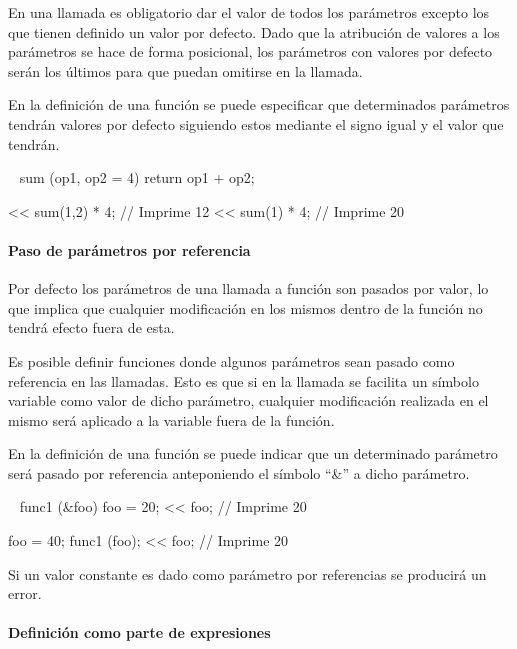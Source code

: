 En una llamada es obligatorio dar el valor de todos los parámetros excepto los que tienen definido un valor por defecto. Dado que la 
atribución de valores a los parámetros se hace de forma posicional, los parámetros con valores por defecto serán los últimos
para que puedan omitirse en la llamada. 

En la definición de una función se puede especificar que determinados parámetros tendrán valores por defecto siguiendo estos mediante el 
signo igual y el valor que tendrán. \\


\begin{myverbatim}
   ~ sum (op1, op2 = 4) { 
      return op1 + op2;
   }
   
   << sum(1,2) * 4; // Imprime 12
   << sum(1) * 4; // Imprime 20
\end{myverbatim} 

\paragraph{Paso de parámetros por referencia} \label{sec:func_ref}
Por defecto los parámetros de una llamada a función son pasados por valor, lo que implica que cualquier modificación 
en los mismos dentro de la función no tendrá efecto fuera de esta. 

Es posible definir funciones donde algunos parámetros sean pasado como referencia en las llamadas. Esto es que si
en la llamada se facilita un símbolo variable como valor de dicho parámetro, cualquier modificación realizada 
en el mismo será aplicado a la variable fuera de la función. 

En la definición de una función se puede indicar que un determinado parámetro será pasado por referencia anteponiendo
el símbolo ``\&'' a dicho parámetro. \\

\begin{myverbatim}
   ~ func1 (&foo) { 
      foo = 20;
      << foo;  // Imprime 20
   }
   
   foo = 40;
   func1 (foo);
   << foo; // Imprime 20
\end{myverbatim}

Si un valor constante es dado como parámetro por referencias se producirá un error.

\paragraph{Definición como parte de expresiones}

